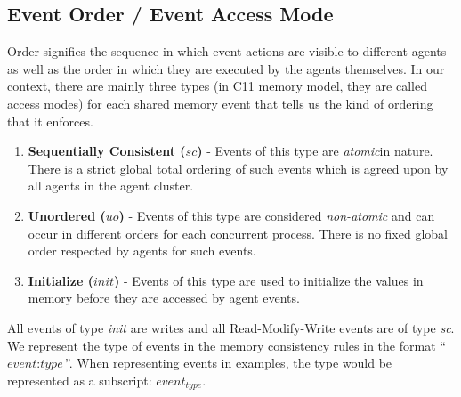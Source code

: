     
    \subsection{Event Order / Event Access Mode} 
        Order signifies the sequence in which event actions are visible to different agents as well as the order in which they are executed by the agents themselves. In our context, there are mainly three types (in C11 memory model, they are called access modes) for each shared memory event that tells us the kind of ordering that it enforces. 
        
        \begin{enumerate}
            \item \textbf{Sequentially Consistent ($sc$)} - Events of this type are \textit{atomic}\footnotemark  in nature. There is a strict global total ordering of such events which is agreed upon by all agents in the agent cluster. 
            
            \item \textbf{Unordered ($uo$)} - Events of this type are considered \textit{non-atomic} and can occur in different orders for each concurrent process. There is no fixed global order respected by agents for such events. 
            
            \item \textbf{Initialize ($init$)} - Events of this type are used to initialize the values in memory before they are accessed by agent events. 
        \end{enumerate}

        All events of type \textit{init} are writes and all Read-Modify-Write events are of type \textit{sc}.  
        We represent the type of events in the memory consistency rules in the format ``$\textit{event} : \textit{type}$''. 
        When representing events in examples, the type would be represented as a subscript: $\textit{event}_\textit{type}$. 
       

